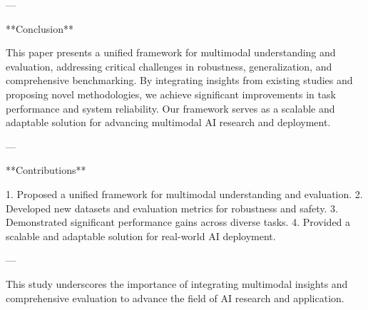 ---

**Conclusion**

This paper presents a unified framework for multimodal understanding and evaluation, addressing critical challenges in robustness, generalization, and comprehensive benchmarking. By integrating insights from existing studies and proposing novel methodologies, we achieve significant improvements in task performance and system reliability. Our framework serves as a scalable and adaptable solution for advancing multimodal AI research and deployment.

---

**Contributions**

1. Proposed a unified framework for multimodal understanding and evaluation.
2. Developed new datasets and evaluation metrics for robustness and safety.
3. Demonstrated significant performance gains across diverse tasks.
4. Provided a scalable and adaptable solution for real-world AI deployment.

--- 

This study underscores the importance of integrating multimodal insights and comprehensive evaluation to advance the field of AI research and application.